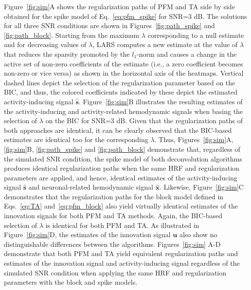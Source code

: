 Figure~\ref{fig:sim}A shows the regularization paths of PFM and TA side by side
obtained for the spike model of Eq.~\eqref{eq:pfm_spike} for SNR=3 dB. The
solutions for all three SNR conditions are shown in Figures~\ref{fig:path_spike}
and \ref{fig:path_block}. Starting from the maximum $\lambda$ corresponding to a
null estimate and for decreasing values of $\lambda$, LARS computes a new
estimate at the value of $\lambda$ that reduces the sparsity promoted by the
\(l_1\)-norm and causes a change in the active set of non-zero coefficients of
the estimate (i.e., a zero coefficient becomes non-zero or vice versa) as shown
in the horizontal axis of the heatmaps. Vertical dashed lines depict the
selection of the regularization parameter based on the BIC, and thus, the
colored coefficients indicated by these depict the estimated activity-inducing
signal $\mathbf{\hat{{s}}}$. Figure~\ref{fig:sim}B illustrates the resulting
estimates of the activity-inducing and activity-related hemodynamic signals when
basing the selection of $\lambda$ on the BIC for SNR=3 dB. Given that the
regularization paths of both approaches are identical, it can be clearly
observed that the BIC-based estimates are identical too for the corresponding
$\lambda$. Thus, Figures~\ref{fig:sim}A, \ref{fig:sim}B, \ref{fig:path_spike}
and \ref{fig:path_block} demonstrate that, regardless of the simulated SNR
condition, the spike model of both deconvolution algorithms produces identical
regularization paths when the same HRF and regularization parameters are
applied, and hence, identical estimates of the activity-inducing signal
$\mathbf{\hat{{s}}}$ and neuronal-related hemodynamic signal
$\mathbf{\hat{{x}}}$. Likewise, Figure~\ref{fig:sim}C demonstrates that the
regularization paths for the block model defined in Eqs.~\eqref{eq:TA}
and~\eqref{eq:pfm_block} also yield virtually identical estimates of the
innovation signals for both PFM and TA methods. Again, the BIC-based selection
of $\lambda$ is identical for both PFM and TA. As illustrated in
Figure~\ref{fig:sim}D, the estimates of the innovation signal $\mathbf{u}$ also
show no distinguishable differences between the algorithms. %
Figures~\ref{fig:sim} A-D demonstrate that both PFM and TA yield equivalent
regularization paths and estimates of the innovation signal and
activity-inducing signal regardless of the simulated SNR condition when applying
the same HRF and regularization parameters with the block and spike models.

